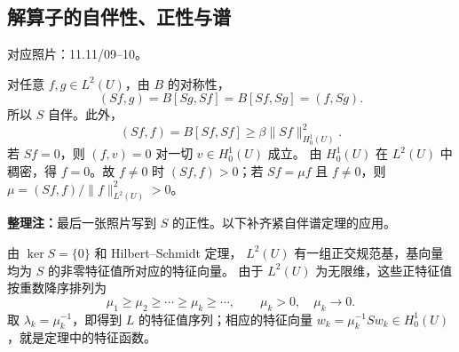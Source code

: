 \documentclass[UTF8,a4paper,11pt,fontset=fandol]{ctexart}
\newcommand{\ednote}[1]{\par{\small\color{notegray}\textbf{整理注：}#1}\par}
\newcommand{\source}[1]{{\small\color{notegray}对应照片：#1。}\par}
\begin{document}
\newpage
\subsection*{解算子的自伴性、正性与谱}
\source{11.11/09--10}
对任意 $f,g\in L^2(U)$，由 $B$ 的对称性，
\[
(Sf,g)=B[Sg,Sf]=B[Sf,Sg]=(f,Sg).
\]
所以 $S$ 自伴。此外，
\[
(Sf,f)=B[Sf,Sf]\geq\beta\|Sf\|_{H_0^1(U)}^2.
\]
若 $Sf=0$，则 $(f,v)=0$ 对一切 $v\in H_0^1(U)$ 成立。
由 $H_0^1(U)$ 在 $L^2(U)$ 中稠密，得 $f=0$。故 $f\ne0$ 时
$(Sf,f)>0$；若 $Sf=\mu f$ 且 $f\ne0$，则
$\mu=(Sf,f)/\|f\|_{L^2(U)}^2>0$。

\ednote{最后一张照片写到 $S$ 的正性。以下补齐紧自伴谱定理的应用。}
由 $\ker S=\{0\}$ 和 Hilbert--Schmidt 定理，
$L^2(U)$ 有一组正交规范基，基向量均为 $S$ 的非零特征值所对应的特征向量。
由于 $L^2(U)$ 为无限维，这些正特征值按重数降序排列为
\[
\mu_1\geq\mu_2\geq\cdots\geq\mu_k\geq\cdots,\qquad \mu_k>0,\quad \mu_k\longrightarrow0.
\]
取 $\lambda_k=\mu_k^{-1}$，即得到 $L$ 的特征值序列；相应的特征向量
$w_k=\mu_k^{-1}Sw_k\in H_0^1(U)$，就是定理中的特征函数。
\end{document}
